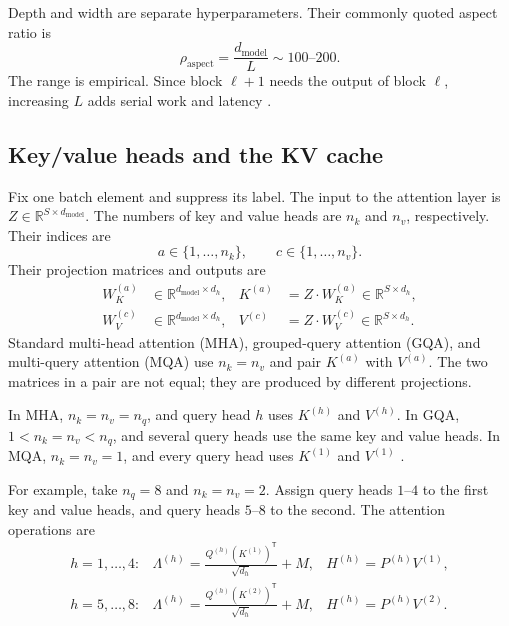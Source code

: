 \documentclass[11pt]{article}
\newcommand{\R}{\mathbb{R}}
\begin{document}
Depth and width are separate hyperparameters.  Their commonly quoted aspect ratio is
\begin{equation}
  \rho_{\mathrm{aspect}}
  =\frac{d_{\mathrm{model}}}{L}
  \sim 100\text{--}200.
  \label{eq:model-aspect-ratio}
\end{equation}
The range is empirical.  Since block $\ell+1$ needs the output of block $\ell$,
increasing $L$ adds serial work and latency
\citep{hashimoto2026architecture}.

\subsection{Key/value heads and the KV cache}

Fix one batch element and suppress its label.  The input to the attention layer is
$Z\in\R^{S\times d_{\mathrm{model}}}$.  The numbers of key and value heads are
$n_k$ and $n_v$, respectively.  Their indices are
\[
  a\in\{1,\ldots,n_k\},
  \qquad
  c\in\{1,\ldots,n_v\}.
\]
Their projection matrices and outputs are
\begin{align}
  W_K^{(a)}&\in\R^{d_{\mathrm{model}}\times d_h},
  &K^{(a)}&=Z\cdot W_K^{(a)}\in\R^{S\times d_h},\\
  W_V^{(c)}&\in\R^{d_{\mathrm{model}}\times d_h},
  &V^{(c)}&=Z\cdot W_V^{(c)}\in\R^{S\times d_h}.
\end{align}
Standard multi-head attention (MHA), grouped-query attention (GQA), and
multi-query attention (MQA) use $n_k=n_v$ and pair $K^{(a)}$ with $V^{(a)}$.
The two matrices in a pair are not equal; they are produced by different
projections.

In MHA, $n_k=n_v=n_q$, and query head $h$ uses $K^{(h)}$ and $V^{(h)}$.
In GQA, $1<n_k=n_v<n_q$, and several query heads use the same key and value
heads.  In MQA, $n_k=n_v=1$, and every query head uses $K^{(1)}$ and
$V^{(1)}$ \citep{ainslie2023gqa}.

For example, take $n_q=8$ and $n_k=n_v=2$.  Assign query heads $1$--$4$ to
the first key and value heads, and query heads $5$--$8$ to the second.  The
attention operations are
\begin{equation}
  \begin{array}{lll}
    h=1,\ldots,4:
    &\displaystyle
      \Lambda^{(h)}=\frac{Q^{(h)}(K^{(1)})^{\mathsf T}}{\sqrt{d_h}}+M,
    &H^{(h)}=P^{(h)}V^{(1)},\\[6pt]
    h=5,\ldots,8:
    &\displaystyle
      \Lambda^{(h)}=\frac{Q^{(h)}(K^{(2)})^{\mathsf T}}{\sqrt{d_h}}+M,
    &H^{(h)}=P^{(h)}V^{(2)}.
  \end{array}
  \label{eq:kv-head-sharing}
\end{equation}
\end{document}
